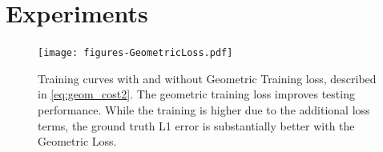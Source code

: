 \documentclass[10pt,twocolumn,letterpaper]{article}
\begin{document}
\section{Experiments}

\begin{figure}
\begin{center}
  \texttt{[image: figures-GeometricLoss.pdf]}
  \end{center}
    \caption{
      Training curves with and without Geometric Training loss, described in \ref{eq:geom_cost2}.
      The geometric training loss improves testing performance.
      While the training is higher due to the additional loss terms, the ground truth L1 error is substantially better with the Geometric Loss.
    }
  \label{fig:short}
  \label{fig:geomloss}
\end{figure}


\end{document}
